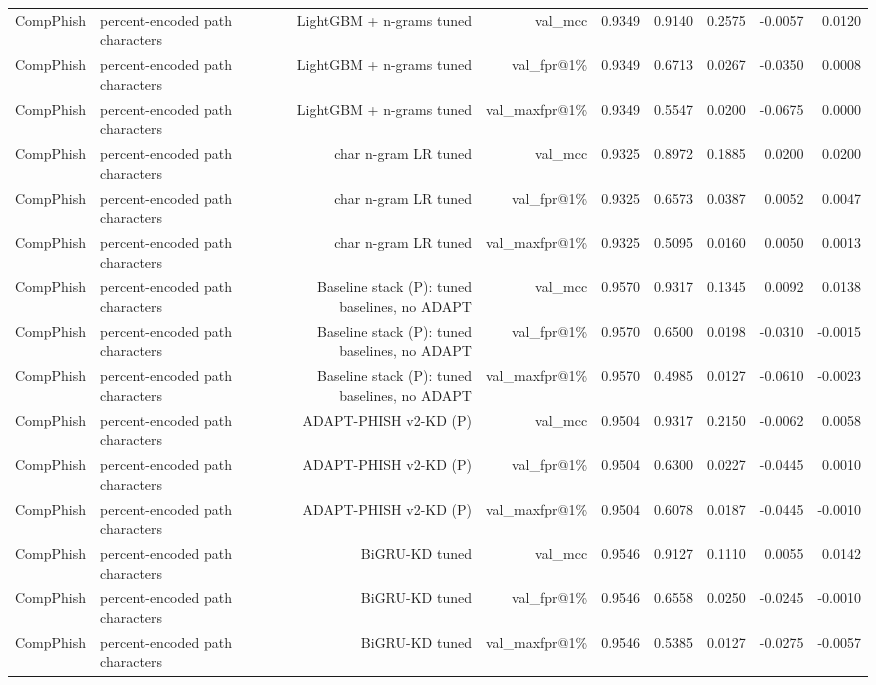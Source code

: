 \begin{table}[t]
\begin{tabular}{llrrrrrrr}
CompPhish & percent-encoded path characters & LightGBM + n-grams tuned & val\_mcc & 0.9349 & 0.9140 & 0.2575 & -0.0057 & 0.0120 \\
CompPhish & percent-encoded path characters & LightGBM + n-grams tuned & val\_fpr@1\% & 0.9349 & 0.6713 & 0.0267 & -0.0350 & 0.0008 \\
CompPhish & percent-encoded path characters & LightGBM + n-grams tuned & val\_maxfpr@1\% & 0.9349 & 0.5547 & 0.0200 & -0.0675 & 0.0000 \\
CompPhish & percent-encoded path characters & char n-gram LR tuned & val\_mcc & 0.9325 & 0.8972 & 0.1885 & 0.0200 & 0.0200 \\
CompPhish & percent-encoded path characters & char n-gram LR tuned & val\_fpr@1\% & 0.9325 & 0.6573 & 0.0387 & 0.0052 & 0.0047 \\
CompPhish & percent-encoded path characters & char n-gram LR tuned & val\_maxfpr@1\% & 0.9325 & 0.5095 & 0.0160 & 0.0050 & 0.0013 \\
CompPhish & percent-encoded path characters & Baseline stack (P): tuned baselines, no ADAPT & val\_mcc & 0.9570 & 0.9317 & 0.1345 & 0.0092 & 0.0138 \\
CompPhish & percent-encoded path characters & Baseline stack (P): tuned baselines, no ADAPT & val\_fpr@1\% & 0.9570 & 0.6500 & 0.0198 & -0.0310 & -0.0015 \\
CompPhish & percent-encoded path characters & Baseline stack (P): tuned baselines, no ADAPT & val\_maxfpr@1\% & 0.9570 & 0.4985 & 0.0127 & -0.0610 & -0.0023 \\
CompPhish & percent-encoded path characters & ADAPT-PHISH v2-KD (P) & val\_mcc & 0.9504 & 0.9317 & 0.2150 & -0.0062 & 0.0058 \\
CompPhish & percent-encoded path characters & ADAPT-PHISH v2-KD (P) & val\_fpr@1\% & 0.9504 & 0.6300 & 0.0227 & -0.0445 & 0.0010 \\
CompPhish & percent-encoded path characters & ADAPT-PHISH v2-KD (P) & val\_maxfpr@1\% & 0.9504 & 0.6078 & 0.0187 & -0.0445 & -0.0010 \\
CompPhish & percent-encoded path characters & BiGRU-KD tuned & val\_mcc & 0.9546 & 0.9127 & 0.1110 & 0.0055 & 0.0142 \\
CompPhish & percent-encoded path characters & BiGRU-KD tuned & val\_fpr@1\% & 0.9546 & 0.6558 & 0.0250 & -0.0245 & -0.0010 \\
CompPhish & percent-encoded path characters & BiGRU-KD tuned & val\_maxfpr@1\% & 0.9546 & 0.5385 & 0.0127 & -0.0275 & -0.0057 \\

\end{tabular}
\end{table}
